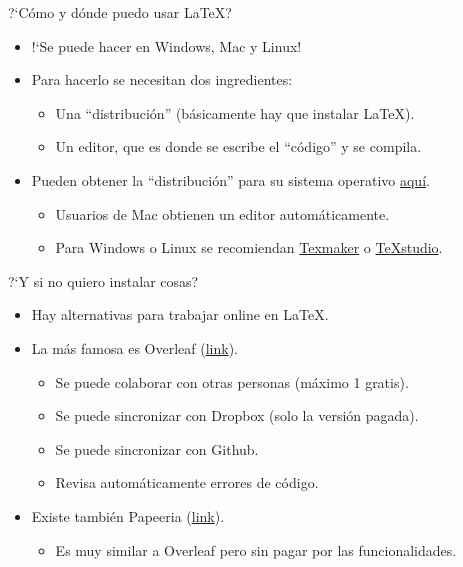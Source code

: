 \documentclass[11pt, handout]{beamer}
\begin{document}
\begin{frame}{?`Cómo y dónde puedo usar \LaTeX?}
	
	\begin{itemize}
		\item !`Se puede hacer en Windows, Mac y Linux!\pause
		\vfill
		
		\item Para hacerlo se necesitan dos ingredientes:\smallskip
			\begin{itemize}
				\item Una ``distribución'' (básicamente hay que instalar {\LaTeX}).\smallskip
				\item Un editor, que es donde se escribe el ``código'' y se compila.\pause
			\end{itemize}
		
		\vfill
		
		\item Pueden obtener la ``distribución'' para su sistema operativo \href{https://www.latex-project.org/get}{aquí}.\smallskip
			\begin{itemize}
				\item Usuarios de Mac obtienen un editor automáticamente.\smallskip
				\item Para Windows o Linux se recomiendan \href{https://www.xm1math.net/texmaker/download.html}{Texmaker} o \href{https://www.texstudio.org}{TeXstudio}.
			\end{itemize}

	\end{itemize}
\end{frame}

\begin{frame}{?`Y si no quiero instalar cosas?}
	
	\begin{itemize}
		\item Hay alternativas para trabajar online en \LaTeX.\pause
		\vfill
		
		\item La más famosa es Overleaf (\href{http://overleaf.com}{link}).\smallskip
			\begin{itemize}
				\item Se puede colaborar con otras personas (máximo 1 gratis).\smallskip
				\item Se puede sincronizar con Dropbox (solo la versión pagada).\smallskip
				\item Se puede sincronizar con Github.\smallskip
				\item Revisa automáticamente errores de código.\pause
			\end{itemize}
		\vfill
			
		\item Existe también Papeeria (\href{https://papeeria.com}{link}).
			\begin{itemize}
				\item Es muy similar a Overleaf pero sin pagar por las funcionalidades.
			\end{itemize}
	\end{itemize}
\end{frame}
\end{document}
